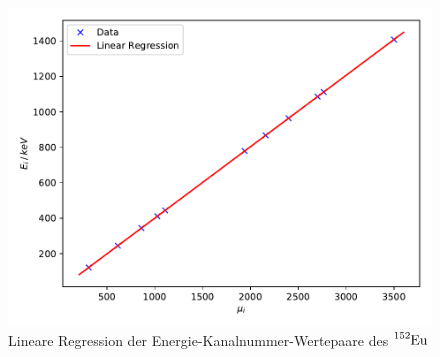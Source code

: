 \begin{figure}
  \centering
  \includegraphics{content/plot5.pdf}
  \caption{Lineare Regression der Energie-Kanalnummer-Wertepaare des $\ce{^{152}Eu}$}
  \label{fig:plot5}
\end{figure}
